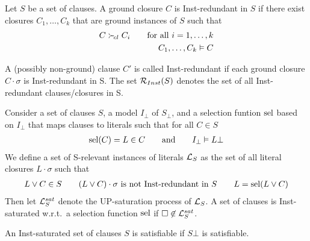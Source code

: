 \begin{definition}
    Let $S$ be a set of clauses.
    A ground closure $C$ is {\myem Inst-redundant} in $S$
    if there exist closures $C_1,\ldots,C_k$
    that are ground instances of $S$ such that
    \begin{align*}
        C \mathrel\succ_{\!cl} C_i \tag*{for all $i=1,\ldots,k$} \\
        C_1,\ldots,C_k\vDash C
    \end{align*}

    A (possibly non-ground) clause $C'$ is called Inst-redundant
    if each ground closure $C\cdot\sigma$ is Inst-redundant in S.
    The set $\mathcal{R}_{Inst}(S)$ denotes the set of all Inst-redundant clauses/closures in S.
\end{definition}

\begin{definition}
    Consider a set of clauses $S$, a model $I_\bot$ of $S_\bot$,
    and a {\myem selection funtion} $\operatorname{sel}$ based on $I_\bot$
    that maps clauses to literals such that for all $C\in S$
    \begin{gather*}
        \operatorname{sel}(C)=L \in C
        \qquad
        \text{and}
        \qquad
        I_\bot \vDash L\bot
    \end{gather*}
    We define a set of {\myem S-relevant} instances of literals $\mathcal{L}_S$
    as the set of all literal closures $L\cdot\sigma$ such that
    \begin{gather*}
        L\lor C\in S
        \qquad
        (L\lor C)\cdot\sigma\text{ is not Inst-redundant in }S
        \qquad
        L = \operatorname{sel}(L\lor C)
    \end{gather*}
    Then let $\mathcal{L}_S^{sat}$ denote the UP-saturation process of $\mathcal{L}_S$.
    A set of clauses is {\myem Inst-saturated} w.r.t.~a selection function $\operatorname{sel}$
    if $\square\not\in\mathcal{L}_S^{sat}$.
\end{definition}

\begin{theorem}
    An Inst-saturated set of clauses $S$ is satisfiable if $S\bot$ is satisfiable.
\end{theorem}

